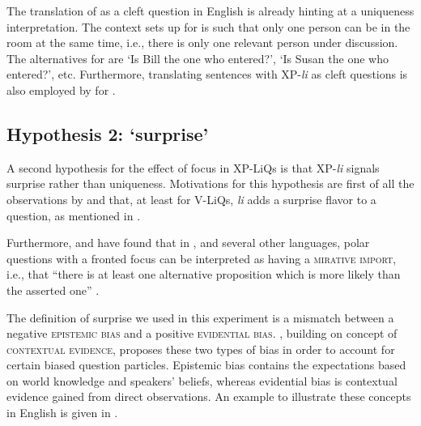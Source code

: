 \documentclass[output=paper,
colorlinks,
citecolor=brown,
newtxmath
]{langscibook}
\begin{document}
\noindent
The translation of  as a cleft question in English is already hinting at a uniqueness interpretation. The context \citet{dukova2010} sets up for  is such that only one person can be in the room at the same time, i.e., there is only one relevant person under discussion. The alternatives for  are `Is Bill the one who entered?', `Is Susan the one who entered?', etc. Furthermore, translating sentences with XP-\textit{li} as cleft questions is also employed by \citet{king1994} for .



\subsection{Hypothesis 2: `surprise'}\label{sec:surprise}
A second hypothesis for the effect of focus in XP-LiQs is that XP-\textit{li} signals surprise rather than uniqueness. Motivations for this hypothesis are first of all the observations by \citet{Rudin.Kramer.Billings.Baerman1999} and \citet{lazarova2003} that, at least for V-LiQs, \textit{li} adds a surprise flavor to a question, as mentioned in .


Furthermore, \citet{bianchi.cruschina2016} and \citet{bianchi.bocci.cruschina2016} have found that in , and several other languages, polar questions with a fronted focus can be interpreted as having a \textsc{mirative import}, i.e., that ``there is at least one alternative proposition which is more likely than the asserted one'' \citep[60]{bianchi.cruschina2016}.

The definition of surprise we used in this experiment is a mismatch between a negative \textsc{epistemic bias}  and a positive \textsc{evidential bias}. \citet{sudo2013}, building on  concept of \textsc{contextual evidence}, proposes these two types of bias in order to account for certain  biased question particles.
Epistemic bias contains the expectations based on world knowledge and speakers' beliefs, whereas evidential bias is contextual evidence gained from direct observations. An example to illustrate these concepts in English is given in .
\end{document}

